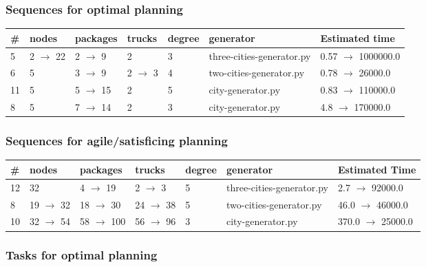 \documentclass{article}
\begin{document}
                            \subsubsection*{Sequences for optimal planning}

                            \begin{center}
                            \begin{tabular}{@{}l|l|l|l|l|l|l@{}}
                            \# & nodes & packages & trucks & degree & generator & Estimated time\\\midrule
                            5&2 $\rightarrow$ 22&2 $\rightarrow$ 9&2&3&three-cities-generator.py&0.57 $\rightarrow$ 1000000.0\\
6&5&3 $\rightarrow$ 9&2 $\rightarrow$ 3&4&two-cities-generator.py&0.78 $\rightarrow$ 26000.0\\
11&5&5 $\rightarrow$ 15&2&5&city-generator.py&0.83 $\rightarrow$ 110000.0\\
8&5&7 $\rightarrow$ 14&2&3&city-generator.py&4.8 $\rightarrow$ 170000.0
                            \end{tabular}
                            \end{center}
                    
                         \subsubsection*{Sequences for agile/satisficing planning}

                        \begin{center}
                        \begin{tabular}{@{}l|l|l|l|l|l|l@{}}
                        \# & nodes & packages & trucks & degree & generator & Estimated Time\\\midrule
                        12&32&4 $\rightarrow$ 19&2 $\rightarrow$ 3&5&three-cities-generator.py&2.7 $\rightarrow$ 92000.0\\
8&19 $\rightarrow$ 32&18 $\rightarrow$ 30&24 $\rightarrow$ 38&5&two-cities-generator.py&46.0 $\rightarrow$ 46000.0\\
10&32 $\rightarrow$ 54&58 $\rightarrow$ 100&56 $\rightarrow$ 96&3&city-generator.py&370.0 $\rightarrow$ 25000.0
                        \end{tabular}
                        \end{center}
                    
                                \subsubsection*{Tasks for optimal planning}
                                
\end{document}
